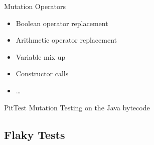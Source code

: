 \begin{frame}{\insertsubsection}
\begin{fancycolumns}[animation=none]
\begin{note}{Mutation Operators}
\begin{itemize}
				\item Boolean operator replacement
				\item Arithmetic operator replacement
				\item Variable mix up
				\item Constructor calls
				\item \dots
			\end{itemize}
		\end{note}\pause
		\begin{note}{PitTest}%
			Mutation Testing on the Java bytecode
		\end{note}
	\end{fancycolumns}
\end{frame}

\subsection{Flaky Tests}
